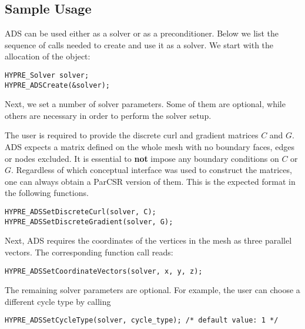 \subsection{Sample Usage}
ADS can be used either as a solver or as a preconditioner.  Below we list the
sequence of \hypre{} calls needed to create and use it as a solver. We start
with the allocation of the  object:
\begin{display}\begin{verbatim}
HYPRE_Solver solver;
HYPRE_ADSCreate(&solver);
\end{verbatim}\end{display}

Next, we set a number of solver parameters. Some of them are optional, while
 others are necessary in order to perform the solver setup.

The user is required to provide the discrete curl and gradient matrices $C$ and
$G$.  ADS expects a matrix defined on the whole mesh with no boundary
faces, edges or nodes excluded. It is essential to {\bf not} impose any boundary
conditions on $C$ or $G$.  Regardless of which \hypre{} conceptual interface
was used to construct the matrices, one can always obtain a ParCSR version of
them. This is the expected format in the following functions.
\begin{display}\begin{verbatim}
HYPRE_ADSSetDiscreteCurl(solver, C);
HYPRE_ADSSetDiscreteGradient(solver, G);
\end{verbatim}\end{display}

Next, ADS requires the coordinates of the vertices in the mesh as three
\hypre{} parallel vectors.  The corresponding function call reads:
\begin{display}\begin{verbatim}
HYPRE_ADSSetCoordinateVectors(solver, x, y, z);
\end{verbatim}\end{display}


The remaining solver parameters are optional.  For example, the user can choose
a different cycle type by calling
\begin{display}\begin{verbatim}
HYPRE_ADSSetCycleType(solver, cycle_type); /* default value: 1 */
\end{verbatim}\end{display}

